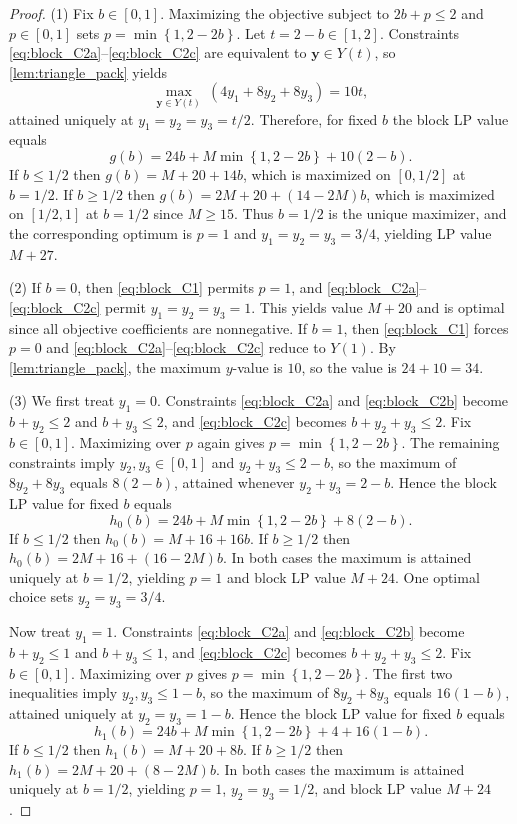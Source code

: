 \documentclass[smallextended,envcountsect]{svjour3} %
\newcommand{\set}[1]{\left\{#1\right\}}
\newcommand{\y}{\mathbf{y}}
\newcommand{\0}{\mathbf{0}}
\newcommand{\1}{\mathbf{1}} %
\begin{document}
\begin{proof}
	(1) Fix $b\in[0,1]$.
	Maximizing the objective subject to $2b+p\le 2$ and $p\in[0,1]$ sets
	$p=\min\set{1,2-2b}$.
	Let $t=2-b\in[1,2]$.
	Constraints \eqref{eq:block_C2a}--\eqref{eq:block_C2c} are equivalent to $\y\in Y(t)$, so
	\cref{lem:triangle_pack} yields
	\[
		\max_{\y\in Y(t)}\ (4y_1+8y_2+8y_3)=10t,
	\]
	attained uniquely at $y_1=y_2=y_3=t/2$.
	Therefore, for fixed $b$ the block LP value equals
	\[
		g(b)=24b+M\min\set{1,2-2b}+10(2-b).
	\]
	If $b\le 1/2$ then $g(b)=M+20+14b$, which is maximized on $[0,1/2]$ at $b=1/2$.
		If $b\ge 1/2$ then $g(b)=2M+20+(14-2M)b$, which is maximized on $[1/2,1]$ at $b=1/2$ since $M\ge 15$.
	Thus $b=1/2$ is the unique maximizer, and the corresponding optimum is $p=1$ and
	$y_1=y_2=y_3=3/4$, yielding LP value $M+27$.

	\smallskip
	(2) If $b=0$, then \eqref{eq:block_C1} permits $p=1$, and \eqref{eq:block_C2a}--\eqref{eq:block_C2c}
	permit $y_1=y_2=y_3=1$. This yields value $M+20$ and is optimal since all objective coefficients are
	nonnegative.
	If $b=1$, then \eqref{eq:block_C1} forces $p=0$ and \eqref{eq:block_C2a}--\eqref{eq:block_C2c} reduce
	to $Y(1)$. By \cref{lem:triangle_pack}, the maximum $y$-value is $10$, so the value is $24+10=34$.

	\smallskip
	(3) We first treat $y_1=0$.
	Constraints \eqref{eq:block_C2a} and \eqref{eq:block_C2b} become $b+y_2\le 2$ and $b+y_3\le 2$, and
	\eqref{eq:block_C2c} becomes $b+y_2+y_3\le 2$.
	Fix $b\in[0,1]$.
	Maximizing over $p$ again gives $p=\min\set{1,2-2b}$.
	The remaining constraints imply $y_2,y_3\in[0,1]$ and $y_2+y_3\le 2-b$, so the maximum of
	$8y_2+8y_3$ equals $8(2-b)$, attained whenever $y_2+y_3=2-b$.
	Hence the block LP value for fixed $b$ equals
	\[
		h_0(b)=24b+M\min\set{1,2-2b}+8(2-b).
	\]
	If $b\le 1/2$ then $h_0(b)=M+16+16b$.
	If $b\ge 1/2$ then $h_0(b)=2M+16+(16-2M)b$.
	In both cases the maximum is attained uniquely at $b=1/2$, yielding $p=1$ and block LP value $M+24$.
	One optimal choice sets $y_2=y_3=3/4$.

	Now treat $y_1=1$.
	Constraints \eqref{eq:block_C2a} and \eqref{eq:block_C2b} become $b+y_2\le 1$ and $b+y_3\le 1$, and
	\eqref{eq:block_C2c} becomes $b+y_2+y_3\le 2$.
	Fix $b\in[0,1]$.
	Maximizing over $p$ gives $p=\min\set{1,2-2b}$.
	The first two inequalities imply $y_2,y_3\le 1-b$, so the maximum of $8y_2+8y_3$ equals $16(1-b)$,
	attained uniquely at $y_2=y_3=1-b$.
	Hence the block LP value for fixed $b$ equals
	\[
		h_1(b)=24b+M\min\set{1,2-2b}+4+16(1-b).
	\]
	If $b\le 1/2$ then $h_1(b)=M+20+8b$.
	If $b\ge 1/2$ then $h_1(b)=2M+20+(8-2M)b$.
	In both cases the maximum is attained uniquely at $b=1/2$, yielding $p=1$, $y_2=y_3=1/2$, and block LP value $M+24$.


\end{proof}
\end{document}
